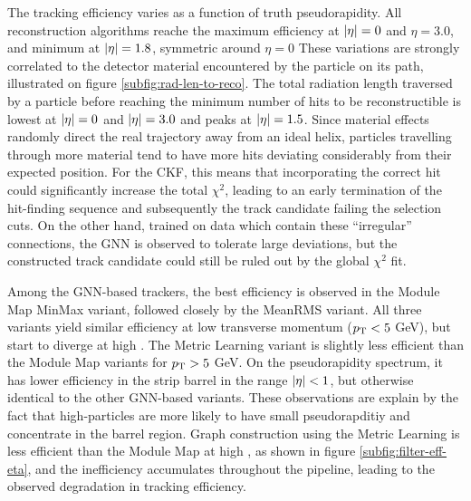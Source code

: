 The tracking efficiency varies as a function of truth pseudorapidity.
All reconstruction algorithms reache the maximum efficiency at $\abs{\eta}=0$ and $\eta=3.0$, and minimum at $\abs{\eta}=1.8$, symmetric around $\eta=0$
These variations are strongly correlated to the detector material encountered by the particle on its path, illustrated on figure \ref{subfig:rad-len-to-reco}. 
The total radiation length traversed by a particle before reaching the minimum number of hits to be reconstructible is lowest at $\abs{\eta}=0$ and $\abs{\eta}=3.0$ 
and peaks at $\abs{\eta}=1.5$. 
Since material effects randomly direct the real trajectory away from an ideal helix, particles travelling through more material tend to have more hits deviating considerably from 
their expected position. 
For the CKF, this means that incorporating the correct hit could significantly increase the total $\chi^2$, leading to an early termination of the hit-finding sequence and 
subsequently the track candidate failing the selection cuts.
On the other hand, trained on data which contain these ``irregular'' connections, the GNN is observed to tolerate large deviations, but the constructed track candidate could
still be ruled out by the global $\chi^2$ fit.

Among the GNN-based trackers, the best efficiency is observed in the {{Module Map MinMax}} variant, followed closely by the {{MeanRMS}} variant.
All three variants yield similar efficiency at low transverse momentum ($p_{\text{T}}<5$ GeV), but start to diverge at high \pT.
The {{Metric Learning}} variant is slightly less efficient than the Module Map variants for $p_{\text{T}} > 5$ GeV.
On the pseudorapidity spectrum, it has lower efficiency in the strip barrel in the range $\abs{\eta}<1$, but otherwise identical to the other GNN-based variants.
These observations are explain by the fact that high-\pT particles are more likely to have small pseudorapditiy and concentrate in the barrel region.
Graph construction using the Metric Learning is less efficient than the Module Map at high \pT, as shown in figure \ref{subfig:filter-eff-eta}, and the inefficiency accumulates throughout the pipeline,
leading to the observed degradation in tracking efficiency. 

